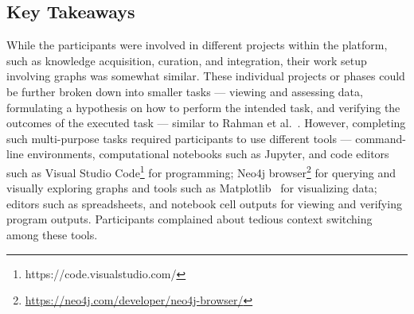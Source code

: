 


\subsection{Key Takeaways}
 While the participants were involved in different projects within the platform, such as knowledge acquisition, curation, and integration, their work setup involving graphs was somewhat similar. These individual projects or phases could be further broken down into smaller tasks ---  viewing and assessing data, formulating a hypothesis on how to perform the intended task, and verifying the outcomes of the executed task --- similar to Rahman et al.~\cite{rahman2022ie}. However, completing such multi-purpose tasks required participants to use different tools --- command-line environments, computational notebooks such as Jupyter, and code editors such as Visual Studio Code\footnote{https://code.visualstudio.com/} for programming; Neo4j browser\footnote{\url{https://neo4j.com/developer/neo4j-browser/}} for querying and visually exploring graphs and tools such as Matplotlib~\cite{hunter2007matplotlib} for visualizing data;  editors such as spreadsheets, and notebook cell outputs for viewing and verifying program outputs. Participants complained about tedious context switching among these tools. 

